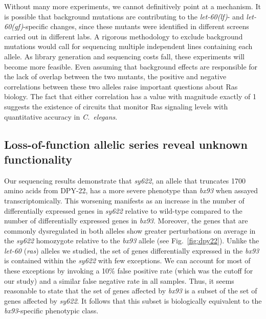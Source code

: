\documentclass[10pt, onecolumn]{article}
\newcommand{\cel}{\emph{C.~elegans}}
\newcommand{\gene}[1]{\mbox{\emph{#1}}}
\newcommand{\protein}[1]{\mbox{\uppercase{#1}}}
\newcommand{\ras}{\gene{let-60} (\emph{ras})}
\newcommand{\letgf}{\gene{let-60(gf)}}
\newcommand{\letlf}{\gene{let-60(lf)}}
\begin{document}
Without many more experiments, we cannot definitively point at a mechanism. It
is possible that background mutations are contributing to the \letlf{}- and
\letgf{}-specific changes, since these mutants were identified in different
screens carried out in different labs. A rigorous methodology to exclude
background mutations would call for sequencing multiple independent lines
containing each allele. As library generation and sequencing costs fall, these
experiments will become more feasible. Even assuming that background effects are
responsible for the lack of overlap between the two mutants, the positive and
negative correlations between these two alleles raise important questions about
Ras biology. The fact that either correlation has a value with magnitude exactly
of 1 suggests the existence of circuits that monitor Ras signaling levels with
quantitative accuracy in \cel{}.

\subsection*{Loss-of-function allelic series reveal unknown functionality}
\label{sec:dpy_conclusion}
Our sequencing results demonstrate that \emph{sy622}, an allele that truncates
1700 amino acids from \protein{dpy-22}, has a more severe phenotype than
\emph{bx93} when assayed transcriptomically.
This worsening manifests as an increase in
the number of differentially expressed genes in \emph{sy622} relative to
wild-type compared to the number of differentially expressed genes in
\emph{bx93}. Moreover, the genes that are commonly dysregulated in both alleles
show greater perturbations on average in the \emph{sy622} homozygote relative to
the \emph{bx93} allele (see Fig.~\ref{fig:dpy22}). Unlike the \ras{} alleles we
studied, the set of genes differentially expressed in the \emph{bx93} is
contained within the \emph{sy622} with few exceptions. We can account for most
of these exceptions by invoking a 10\% false positive rate (which was the cutoff
for our study) and a similar false negative rate in all samples. Thus, it seems
reasonable to state that the set of genes affected by \emph{bx93} is a subset of
the set of genes affected by \emph{sy622}. It follows that this subset is
biologically equivalent to the \emph{bx93}-specific phenotypic class.
\end{document}
